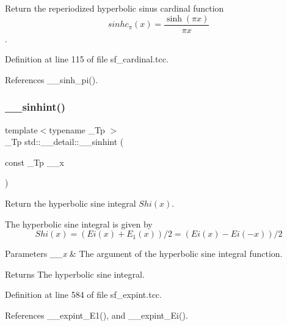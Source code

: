 Return the reperiodized hyperbolic sinus cardinal function \[ sinhc_\pi(x) = \frac{\sinh(\pi x)}{\pi x} \]. 



Definition at line 115 of file sf\+\_\+cardinal.\+tcc.



References \+\_\+\+\_\+sinh\+\_\+pi().

\mbox{\label{namespacestd_1_1____detail_ac629f9c743a716608af2007d2e34438d}} 
\subsubsection{\texorpdfstring{\+\_\+\+\_\+sinhint()}{\_\_sinhint()}}
{\footnotesize\ttfamily template$<$typename \+\_\+\+Tp $>$ \\
\+\_\+\+Tp std\+::\+\_\+\+\_\+detail\+::\+\_\+\+\_\+sinhint (\begin{DoxyParamCaption}\item[{const \+\_\+\+Tp}]{\+\_\+\+\_\+x }\end{DoxyParamCaption})}



Return the hyperbolic sine integral $ Shi(x) $. 

The hyperbolic sine integral is given by \[ Shi(x) = (Ei(x) + E_1(x))/2 = (Ei(x) - Ei(-x))/2 \]


\begin{DoxyParams}{Parameters}
{\em \+\_\+\+\_\+x} & The argument of the hyperbolic sine integral function. \\
\hline
\end{DoxyParams}
\begin{DoxyReturn}{Returns}
The hyperbolic sine integral. 
\end{DoxyReturn}


Definition at line 584 of file sf\+\_\+expint.\+tcc.



References \+\_\+\+\_\+expint\+\_\+\+E1(), and \+\_\+\+\_\+expint\+\_\+\+Ei().

\mbox{\label{namespacestd_1_1____detail_ac2ae8a144f79bd793e1b5d80a3b082b1}} 
